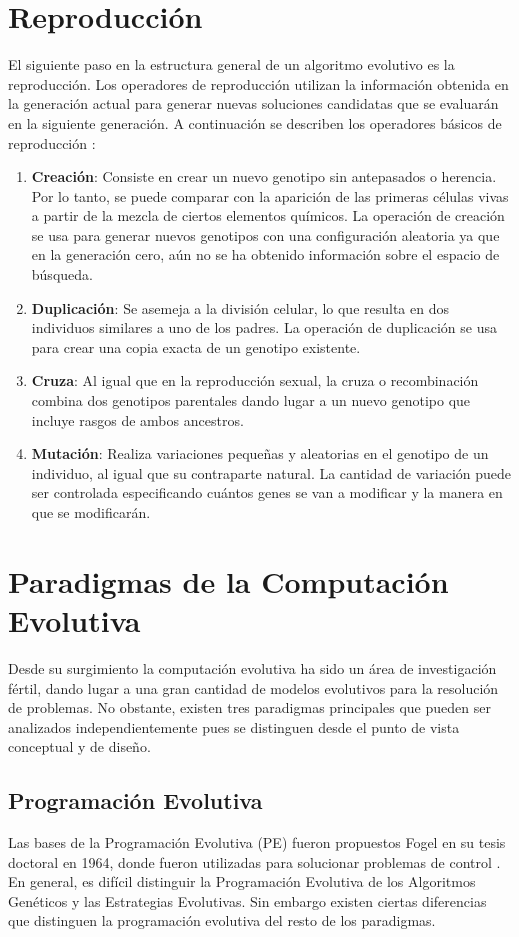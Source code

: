 \section{Reproducción}\label{Reproduccion} 
El siguiente paso en la estructura general de un algoritmo evolutivo es la reproducción. Los operadores de reproducción utilizan la información obtenida en la generación actual para generar nuevas soluciones candidatas que se evaluarán en la siguiente generación. A continuación se describen los operadores básicos de reproducción \cite{weise2009global}:
\begin{enumerate}
\item \textbf{Creación}: Consiste en crear un nuevo genotipo sin antepasados o herencia. Por lo tanto, se puede comparar con la aparición de las primeras células vivas a partir de la mezcla de ciertos elementos químicos. La operación de creación se usa para generar nuevos genotipos con una configuración aleatoria ya que en la generación cero, aún no se ha obtenido información sobre el espacio de búsqueda. 
\item \textbf{Duplicación}: Se asemeja a la división celular, lo que resulta en dos individuos similares a uno de los padres.  La operación de duplicación se usa para crear una copia exacta de un genotipo existente.
\item \textbf{Cruza}: Al igual que en la reproducción sexual, la cruza o recombinación combina dos genotipos parentales dando lugar a un nuevo genotipo que incluye rasgos de ambos ancestros. 

\item \textbf{Mutación}: Realiza variaciones pequeñas y aleatorias en el genotipo de un individuo, al igual que su contraparte natural. La cantidad de variación puede ser controlada especificando cuántos genes se van a modificar y la manera en que se modificarán.
\end{enumerate}



\section{Paradigmas de la Computación Evolutiva}
Desde su surgimiento la computación evolutiva ha sido un área de investigación fértil, dando lugar a una gran cantidad de modelos evolutivos para la resolución de problemas. No obstante, existen tres paradigmas principales que pueden ser analizados independientemente pues se distinguen desde el punto de vista conceptual y de diseño. 
\subsection{Programación Evolutiva}
Las bases de la Programación Evolutiva (PE) fueron propuestos  Fogel  en su tesis doctoral en 1964, donde fueron utilizadas para solucionar problemas de control \cite{fogel1993applying}. En general, es difícil distinguir la Programación Evolutiva de los Algoritmos Genéticos y las Estrategias Evolutivas. Sin embargo existen ciertas diferencias que distinguen la programación evolutiva del resto de los paradigmas.

